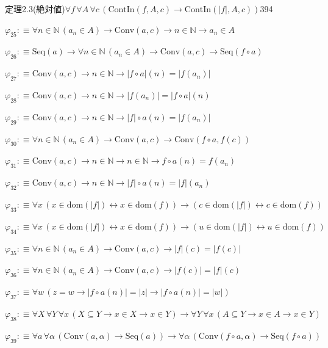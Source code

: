 \begin{fullproof}{定理2.3(絶対値)}{$\forall f\,\forall A\,\forall c\,(\mathrm{ContIn}(f,A,c) \to \mathrm{ContIn}(\lvert f \rvert,A,c))$}{394}
\begin{abbrevlist}
\item $\varphi_{25} :\equiv \forall n \in \mathbb{N}\,(a_{n} \in A) \to \mathrm{Conv}(a,c) \to n \in \mathbb{N} \to a_{n} \in A$
\item $\varphi_{26} :\equiv \mathrm{Seq}(a) \to \forall n \in \mathbb{N}\,(a_{n} \in A) \to \mathrm{Conv}(a,c) \to \mathrm{Seq}(f \circ a)$
\item $\varphi_{27} :\equiv \mathrm{Conv}(a,c) \to n \in \mathbb{N} \to \lvert f \circ a \rvert(n) = \lvert f(a_{n}) \rvert$
\item $\varphi_{28} :\equiv \mathrm{Conv}(a,c) \to n \in \mathbb{N} \to \lvert f(a_{n}) \rvert = \lvert f \circ a \rvert(n)$
\item $\varphi_{29} :\equiv \mathrm{Conv}(a,c) \to n \in \mathbb{N} \to \lvert f \rvert \circ a(n) = \lvert f(a_{n}) \rvert$
\item $\varphi_{30} :\equiv \forall n \in \mathbb{N}\,(a_{n} \in A) \to \mathrm{Conv}(a,c) \to \mathrm{Conv}(f \circ a,f(c))$
\item $\varphi_{31} :\equiv \mathrm{Conv}(a,c) \to n \in \mathbb{N} \to n \in \mathbb{N} \to f \circ a(n) = f(a_{n})$
\item $\varphi_{32} :\equiv \mathrm{Conv}(a,c) \to n \in \mathbb{N} \to \lvert f \rvert \circ a(n) = \lvert f \rvert(a_{n})$
\item $\varphi_{33} :\equiv \forall x\,(x \in \mathrm{dom}(\lvert f \rvert) \leftrightarrow x \in \mathrm{dom}(f)) \to (c \in \mathrm{dom}(\lvert f \rvert) \leftrightarrow c \in \mathrm{dom}(f))$
\item $\varphi_{34} :\equiv \forall x\,(x \in \mathrm{dom}(\lvert f \rvert) \leftrightarrow x \in \mathrm{dom}(f)) \to (u \in \mathrm{dom}(\lvert f \rvert) \leftrightarrow u \in \mathrm{dom}(f))$
\item $\varphi_{35} :\equiv \forall n \in \mathbb{N}\,(a_{n} \in A) \to \mathrm{Conv}(a,c) \to \lvert f \rvert(c) = \lvert f(c) \rvert$
\item $\varphi_{36} :\equiv \forall n \in \mathbb{N}\,(a_{n} \in A) \to \mathrm{Conv}(a,c) \to \lvert f(c) \rvert = \lvert f \rvert(c)$
\item $\varphi_{37} :\equiv \forall w\,(z = w \to \lvert f \circ a(n) \rvert = \lvert z \rvert \to \lvert f \circ a(n) \rvert = \lvert w \rvert)$
\item $\varphi_{38} :\equiv \forall X\,\forall Y\,\forall x\,(X \subseteq Y \to x \in X \to x \in Y) \to \forall Y\,\forall x\,(A \subseteq Y \to x \in A \to x \in Y)$
\item $\varphi_{39} :\equiv \forall a\,\forall \alpha\,(\mathrm{Conv}(a,\alpha) \to \mathrm{Seq}(a)) \to \forall \alpha\,(\mathrm{Conv}(f \circ a,\alpha) \to \mathrm{Seq}(f \circ a))$

\end{abbrevlist}
\end{fullproof}
